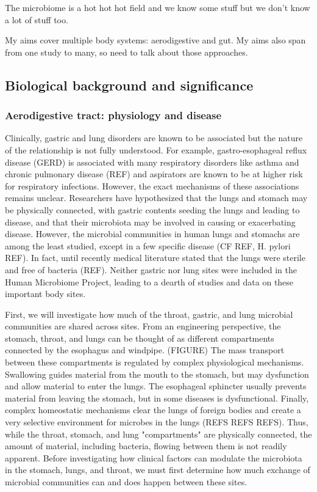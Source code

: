 \documentclass[12pt]{article}
\begin{document}
The microbiome is a hot hot hot field and we know some stuff but we don't know a lot of stuff too.

My aims cover multiple body systems: aerodigestive and gut. My aims also span from one study to many, so need to talk about those approaches.

\subsection{Biological background and significance}

\subsubsection{Aerodigestive tract: physiology and disease}
Clinically, gastric and lung disorders are known to be associated but the nature of the relationship is not fully understood. For example, gastro-esophageal reflux disease (GERD) is associated with many respiratory disorders like asthma and chronic pulmonary disease (REF) and aspirators are known to be at higher risk for respiratory infections. However, the exact mechanisms of these associations remains unclear. Researchers have hypothesized that the lungs and stomach may be physically connected, with gastric contents seeding the lungs and leading to disease, and that their microbiota may be involved in causing or exacerbating disease. However, the microbial communities in human lungs and stomachs are among the least studied, except in a few specific disease (CF REF, H. pylori REF). In fact, until recently medical literature stated that the lungs were sterile and free of bacteria (REF). Neither gastric nor lung sites were included in the Human Microbiome Project, leading to a dearth of studies and data on these important body sites.

First, we will investigate how much of the throat, gastric, and lung microbial communities are shared across sites. From an engineering perspective, the stomach, throat, and lungs can be thought of as different compartments connected by the esophagus and windpipe. (FIGURE) The mass transport between these compartments is regulated by complex physiological mechanisms. Swallowing guides material from the mouth to the stomach, but may dysfunction and allow material to enter the lungs. The esophageal sphincter usually prevents material from leaving the stomach, but in some diseases is dysfunctional. Finally, complex homeostatic mechanisms clear the lungs of foreign bodies and create a very selective environment for microbes in the lungs (REFS REFS REFS). Thus, while the throat, stomach, and lung "compartments" are physically connected, the amount of material, including bacteria, flowing between them is not readily apparent. Before investigating how clinical factors can modulate the microbiota in the stomach, lungs, and throat, we must first determine how much exchange of microbial communities can and does happen between these sites.
\end{document}

